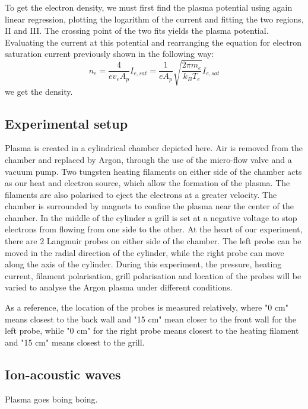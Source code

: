 To get the electron density, we must first find the plasma potential using again linear regression, plotting the logarithm of the current and fitting the two regions, II and III.
The crossing point of the two fits yields the plasma potential.
Evaluating the current at this potential and rearranging the equation for electron saturation current previously shown in the following way:
\begin{equation}
    n_e = \frac{4}{e v_e A_p} I_{e,sat} = \frac{1}{e A_p} \sqrt{\frac{2 \pi m_e}{k_B T_e}} I_{e,sat}
\end{equation}
we get the density.


\subsection{Experimental setup}
Plasma is created in a cylindrical chamber depicted here. Air is removed from the chamber and replaced by Argon, through the use of the micro-flow valve and a vacuum pump. Two tungsten heating filaments on either side of the chamber acts as our heat and electron source, which allow the formation of the plasma. The filaments are also polarised to eject the electrons at a greater velocity. The chamber is surrounded by magnets to confine the plasma near the center of the chamber.
In the middle of the cylinder a grill is set at a negative voltage to stop electrons from flowing from one side to the other.
At the heart of our experiment, there are 2 Langmuir probes on either side of the chamber. The left probe can be moved in the radial direction of the cylinder, while the right probe can move along the axis of the cylinder.
During this experiment, the pressure, heating current, filament polarisation, grill polarisation and location of the probes will be varied to analyse the Argon plasma under different conditions.

As a reference, the location of the probes is measured relatively, where "0 cm" means closest to the back wall and "15 cm" mean closer to the front wall for the left probe, while "0 cm" for the right probe means closest to the heating filament and "15 cm" means closest to the grill.



\subsection{Ion-acoustic waves}
Plasma goes boing boing.


